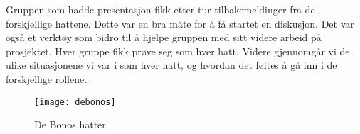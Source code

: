 \vspace{1.0em}







Gruppen som hadde presentasjon fikk etter tur tilbakemeldinger fra de
forskjellige hattene. Dette var en bra måte for å få startet en
diskusjon. Det var også et verktøy som bidro til å hjelpe gruppen med
sitt videre arbeid på prosjektet. Hver gruppe fikk prøve seg som hver
hatt. Videre gjennomgår vi de ulike situasjonene vi var i som hver hatt,
og hvordan det føltes å gå inn i de forskjellige rollene.
\begin{figure} [H]
		\begin{center}
			\texttt{[image: debonos]}
		\end{center}
	\caption{De Bonos hatter}
	\label{fig:hats}
\end{figure}
